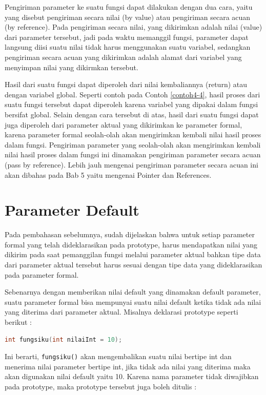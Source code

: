 Pengiriman parameter ke suatu fungsi dapat dilakukan dengan dua cara,
yaitu yang disebut pengiriman secara nilai (by value) atau pengiriman
secara acuan (by reference). Pada pengiriman secara nilai, yang
dikirimkan adalah nilai (value) dari parameter tersebut, jadi pada waktu
memanggil fungsi, parameter dapat langsung diisi suatu nilai tidak harus
menggunakan suatu variabel, sedangkan pengiriman secara acuan yang
dikirimkan adalah alamat dari variabel yang menyimpan nilai yang
dikirmkan tersebut.

Hasil dari suatu fungsi dapat diperoleh dari nilai kembaliannya (return)
atau dengan variabel global. Seperti contoh pada Contoh \ref{contoh4-4}, hasil proses
dari suatu fungsi tersebut dapat diperoleh karena variabel yang dipakai
dalam fungsi bersifat global. Selain dengan cara tersebut di atas, hasil
dari suatu fungsi dapat juga diperoleh dari parameter aktual yang
dikirimkan ke parameter formal, karena parameter formal seolah-olah akan
mengirimkan kembali nilai hasil proses dalam fungsi. Pengiriman
parameter yang seolah-olah akan mengirimkan kembali nilai hasil proses
dalam fungsi ini dinamakan pengiriman parameter secara acuan (pass by
reference). Lebih jauh mengenai pengiriman parameter secara acuan ini
akan dibahas pada Bab 5 yaitu mengenai Pointer dan References.

\section{Parameter Default}\label{parameter-default}

Pada pembahasan sebelumnya, sudah dijelaskan bahwa untuk setiap
parameter formal yang telah dideklarasikan pada prototype, harus
mendapatkan nilai yang dikirim pada saat pemanggilan fungsi melalui
parameter aktual bahkan tipe data dari parameter aktual tersebut harus
sesuai dengan tipe data yang dideklarasikan pada parameter formal.

Sebenarnya dengan memberikan nilai default yang dinamakan default
parameter, suatu parameter formal bisa mempunyai suatu nilai default
ketika tidak ada nilai yang diterima dari parameter aktual. Misalnya
deklarasi prototype seperti berikut :

\begin{lstlisting}[language=c++, numbers=none]
int fungsiku(int nilaiInt = 10);  
\end{lstlisting}

Ini berarti, \texttt{fungsiku()} akan mengembalikan suatu nilai bertipe
int dan menerima nilai parameter bertipe int, jika tidak ada nilai yang
diterima maka akan digunakan nilai default yaitu 10. Karena nama
parameter tidak diwajibkan pada prototype, maka prototype tersebut juga
boleh ditulis :

